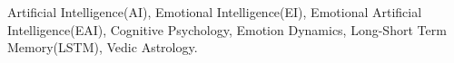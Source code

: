 Artificial Intelligence(AI), Emotional Intelligence(EI), Emotional Artificial Intelligence(EAI), Cognitive Psychology, Emotion Dynamics, Long-Short Term Memory(LSTM), Vedic Astrology.